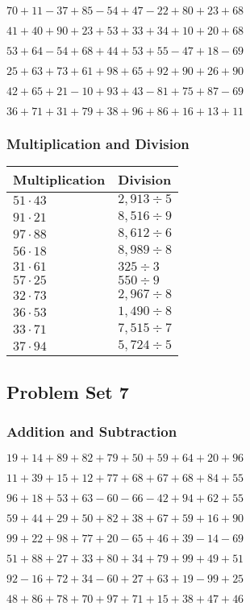 \(70+11-37+85-54+47-22+80+23+68\)

\(41+40+90+23+53+33+34+10+20+68\)

\(53+64-54+68+44+53+55-47+18-69\)

\(25+63+73+61+98+65+92+90+26+90\)

\(42+65+21-10+93+43-81+75+87-69\)

\(36+71+31+79+38+96+86+16+13+11\)

\hypertarget{multiplication-and-division-46}{%
\subsubsection{Multiplication and
Division}\label{multiplication-and-division-46}}

\begin{longtable}[]{@{}ll@{}}
\toprule
Multiplication & Division\tabularnewline
\midrule
\endhead
\(51\cdot43\) & \(2,913÷5\)\tabularnewline
\(91\cdot21\) & \(8,516÷9\)\tabularnewline
\(97\cdot88\) & \(8,612÷6\)\tabularnewline
\(56\cdot18\) & \(8,989÷8\)\tabularnewline
\(31\cdot61\) & \(325÷3\)\tabularnewline
\(57\cdot25\) & \(550÷9\)\tabularnewline
\(32\cdot73\) & \(2,967÷8\)\tabularnewline
\(36\cdot53\) & \(1,490÷8\)\tabularnewline
\(33\cdot71\) & \(7,515÷7\)\tabularnewline
\(37\cdot94\) & \(5,724÷5\)\tabularnewline
\bottomrule
\end{longtable}

\hypertarget{problem-set-7-1}{%
\subsection{Problem Set 7}\label{problem-set-7-1}}

\hypertarget{addition-and-subtraction-47}{%
\subsubsection{Addition and
Subtraction}\label{addition-and-subtraction-47}}

\(19+14+89+82+79+50+59+64+20+ 96\)

\(11+39+15+12+77+68+67+68+84+55\)

\(96+18+53+63-60-66-42+94+62+55\)

\(59+44+29+50+82+38+67+59+16+90\)

\(99+22+98+77+20-65+46+39-14-69\)

\(51+88+27+33+80+34+79+99+49+51\)

\(92-16+72+34-60+27+63+19-99+25\)

\(48+86+78+70+97+71+15+38+47+46\)

